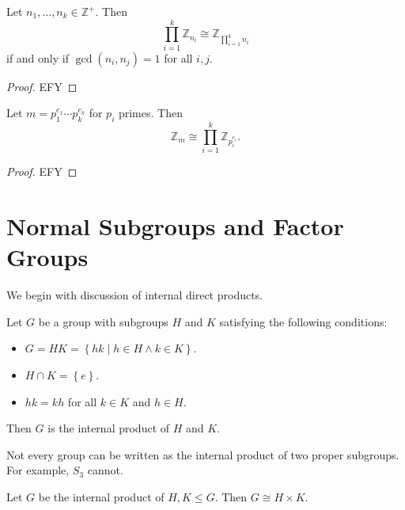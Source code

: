\begin{corollary}
	Let $n_1, \dots, n_k\in\mathbb{Z}^+$. Then
	\[
		\prod_{i=1}^{k} \mathbb{Z}_{n_i}\cong \mathbb{Z}_{\prod_{i=1}^{k} n_i } 
	\]
	if and only if $\operatorname{gcd}(n_i,n_j) =1$ for all $i,j$.
\end{corollary}
\begin{proof}
	EFY
\end{proof}
\begin{corollary}
	Let $m=p_1^{e_1} \cdots p_k^{e_k}$ for $p_i$ primes. Then
	\[
		\mathbb{Z}_m \cong \prod_{i=1}^{k} \mathbb{Z}_{p_i^{e_i}} 
	.\]
\end{corollary}
\begin{proof}
	EFY
\end{proof}
\chapter{Normal Subgroups and Factor Groups}
We begin with discussion of internal direct products. 
\begin{definition}\label{dfn:jksd}
Let $G$ be a group with subgroups $H$ and $K$ satisfying the following conditions:
\begin{itemize}
	\item $G=HK=\left\{ hk \mid h\in H\land k\in K \right\} $.
	\item $H\cap K=\left\{ e \right\} $.
	\item $hk=kh$ for all $k\in K$ and $h\in H$.
\end{itemize}
Then $G$ is the internal product of $H$ and $K$.
\end{definition}

\begin{note}
	Not every group can be written as the internal product of two proper subgroups. For example, $S_3$ cannot.
\end{note}
\begin{theorem}\label{thm:ksjd}
	Let $G$ be the internal product of $H,K\leq G$. Then $G\cong H\times K$.
\end{theorem}
